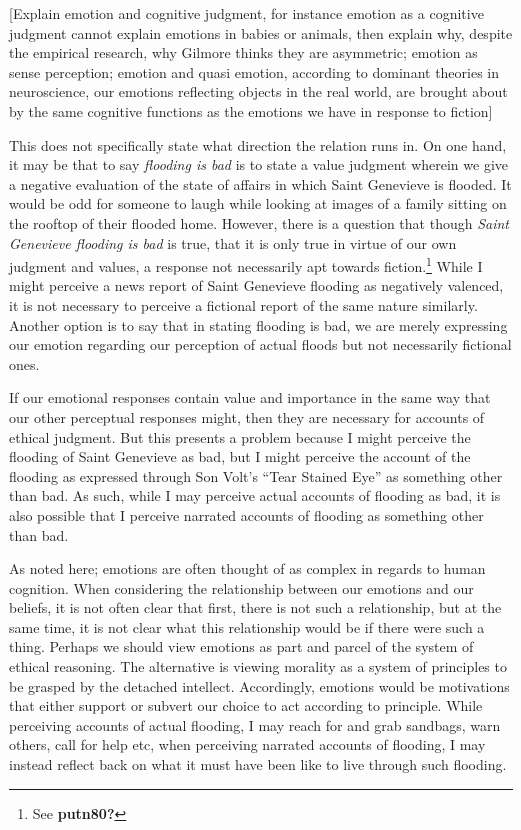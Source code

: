 \documentclass[
  12pt,
]{book}
\theoremstyle{definition}
\theoremstyle{definition}
\theoremstyle{definition}
\theoremstyle{definition}
\theoremstyle{remark}
\begin{document}
{[}Explain emotion and cognitive judgment, for instance emotion as a cognitive judgment cannot explain emotions in babies or animals, then explain why, despite the empirical research, why Gilmore thinks they are asymmetric; emotion as sense perception; emotion and quasi emotion, according to dominant theories in neuroscience, our emotions reflecting objects in the real world, are brought about by the same cognitive functions as the emotions we have in response to fiction{]}

This does not specifically state what direction the relation runs in. On one hand, it may be that to say \emph{flooding is bad} is to state a value judgment wherein we give a negative evaluation of the state of affairs in which Saint Genevieve is flooded. It would be odd for someone to laugh while looking at images of a family sitting on the rooftop of their flooded home. However, there is a question that though \emph{Saint Genevieve flooding is bad} is true, that it is only true in virtue of our own judgment and values, a response not necessarily apt towards fiction.\footnote{See \textbf{putn80?}} While I might perceive a news report of Saint Genevieve flooding as negatively valenced, it is not necessary to perceive a fictional report of the same nature similarly. Another option is to say that in stating flooding is bad, we are merely expressing our emotion regarding our perception of actual floods but not necessarily fictional ones.

If our emotional responses contain value and importance in the same way that our other perceptual responses might, then they are necessary for accounts of ethical judgment. But this presents a problem because I might perceive the flooding of Saint Genevieve as bad, but I might perceive the account of the flooding as expressed through Son Volt's ``Tear Stained Eye'' as something other than bad. As such, while I may perceive actual accounts of flooding as bad, it is also possible that I perceive narrated accounts of flooding as something other than bad.

As noted here; emotions are often thought of as complex in regards to human cognition. When considering the relationship between our emotions and our beliefs, it is not often clear that first, there is not such a relationship, but at the same time, it is not clear what this relationship would be if there were such a thing. Perhaps we should view emotions as part and parcel of the system of ethical reasoning. The alternative is viewing morality as a system of principles to be grasped by the detached intellect. Accordingly, emotions would be motivations that either support or subvert our choice to act according to principle. While perceiving accounts of actual flooding, I may reach for and grab sandbags, warn others, call for help etc, when perceiving narrated accounts of flooding, I may instead reflect back on what it must have been like to live through such flooding.
\end{document}
